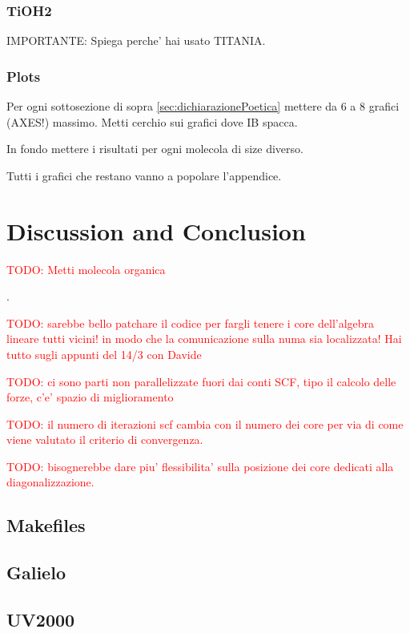 \documentclass[a4paper,12pt]{article}
\newcommand\mynotes[1]{\begin{flushright}

\textcolor{red}{TODO: #1}\end{flushright}}
\begin{document}
\subsubsection{TiOH2}
IMPORTANTE: Spiega perche' hai usato TITANIA.

\subsubsection{Plots}
Per ogni sottosezione di sopra \ref{sec:dichiarazionePoetica} mettere da 6 a 8 grafici (AXES!) massimo.
Metti cerchio sui grafici dove IB spacca.


In fondo mettere i risultati per ogni molecola di size diverso.
	
Tutti i grafici che restano vanno a popolare l'appendice.

\section{Discussion and Conclusion}

\mynotes{Metti molecola organica}.

\mynotes{sarebbe bello patchare il codice per fargli tenere i core dell'algebra lineare tutti vicini! in modo che la comunicazione sulla numa sia localizzata! Hai tutto sugli appunti del 14/3 con Davide}

\mynotes{ci sono parti non parallelizzate fuori dai conti SCF, tipo il calcolo delle forze, c'e' spazio di miglioramento}
\mynotes{il numero di iterazioni scf cambia con il numero dei core per via di come viene valutato il criterio di convergenza.}
\mynotes{bisognerebbe dare piu' flessibilita' sulla posizione dei core dedicati alla diagonalizzazione.}

\newpage

\begin{appendices}

\section{Makefiles} \label{app:makefiles}
\subsection{Galielo}


\newpage
\subsection{UV2000}


\end{appendices}
\end{document}
